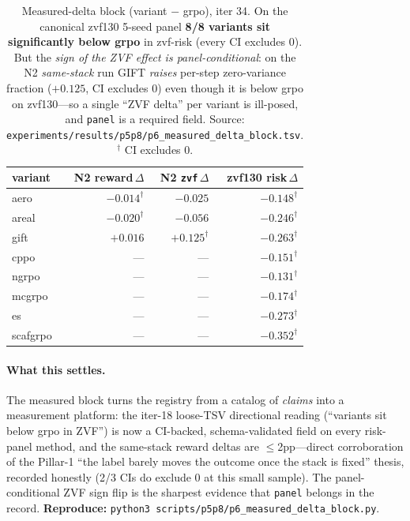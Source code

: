 \begin{table}[t]
\centering\small
\caption{Measured-delta block (variant $-$ grpo), iter 34. On the
canonical zvf130 5-seed panel \textbf{8/8 variants sit significantly
below grpo} in zvf-risk (every CI excludes 0). But the \emph{sign of the
ZVF effect is panel-conditional}: on the N2 \emph{same-stack} run GIFT
\emph{raises} per-step zero-variance fraction ($+0.125$, CI excludes 0)
even though it is below grpo on zvf130---so a single ``ZVF delta'' per
variant is ill-posed, and \texttt{panel} is a required field.
Source: \texttt{experiments/results/p5p8/p6\_measured\_delta\_block.tsv}.
$^{\dagger}$ CI excludes 0.}
\label{tab:p6-measured-delta}
\begin{tabular}{l r r r}
\toprule
variant & N2 reward\,$\Delta$ & N2 \texttt{zvf}\,$\Delta$ & zvf130 risk\,$\Delta$ \\
\midrule
aero     & $-0.014^{\dagger}$ & $-0.025$            & $-0.148^{\dagger}$ \\
areal    & $-0.020^{\dagger}$ & $-0.056$            & $-0.246^{\dagger}$ \\
gift     & $+0.016$           & $+0.125^{\dagger}$  & $-0.263^{\dagger}$ \\
cppo     & ---                & ---                 & $-0.151^{\dagger}$ \\
ngrpo    & ---                & ---                 & $-0.131^{\dagger}$ \\
mcgrpo   & ---                & ---                 & $-0.174^{\dagger}$ \\
es       & ---                & ---                 & $-0.273^{\dagger}$ \\
scafgrpo & ---                & ---                 & $-0.352^{\dagger}$ \\
\bottomrule
\end{tabular}
\end{table}

\paragraph{What this settles.} The measured block turns the registry from
a catalog of \emph{claims} into a measurement platform: the iter-18
loose-TSV directional reading (``variants sit below grpo in ZVF'') is now
a CI-backed, schema-validated field on every risk-panel method, and the
same-stack reward deltas are $\leq$2pp---direct corroboration of the
Pillar-1 ``the label barely moves the outcome once the stack is fixed''
thesis, recorded honestly (2/3 CIs do exclude 0 at this small sample).
The panel-conditional ZVF sign flip is the sharpest evidence that
\texttt{panel} belongs in the record. \textbf{Reproduce:}
\texttt{python3 scripts/p5p8/p6\_measured\_delta\_block.py}.

